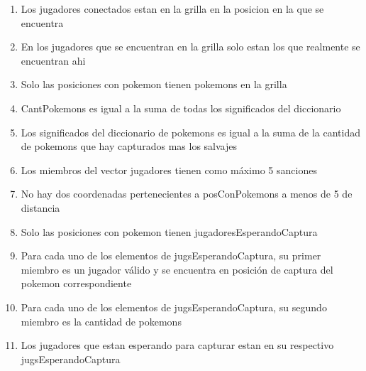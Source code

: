\begin{Representacion}
\begin{enumerate}
		\item Los jugadores conectados estan en la grilla en la posicion en la que se encuentra 

		\item En los jugadores que se encuentran en la grilla solo estan los que realmente se encuentran ahi 

		\item Solo las posiciones con pokemon tienen pokemons en la grilla

		\item CantPokemons es igual a la suma de todas los significados del diccionario 

		\item Los significados del diccionario de pokemons es igual a la suma de la cantidad de pokemons que hay capturados mas los salvajes 

		\item Los miembros del vector jugadores tienen como máximo 5 sanciones 

		\item No hay dos coordenadas pertenecientes a posConPokemons a menos de 5 de distancia

		\item Solo las posiciones con pokemon tienen jugadoresEsperandoCaptura

		\item Para cada uno de los elementos de jugsEsperandoCaptura, su primer miembro es un jugador válido y se encuentra en posición de captura del pokemon correspondiente

		\item Para cada uno de los elementos de jugsEsperandoCaptura, su segundo miembro es la cantidad de pokemons

		\item Los jugadores que estan esperando para capturar estan en su respectivo jugsEsperandoCaptura

	\end{enumerate}




\end{Representacion}
